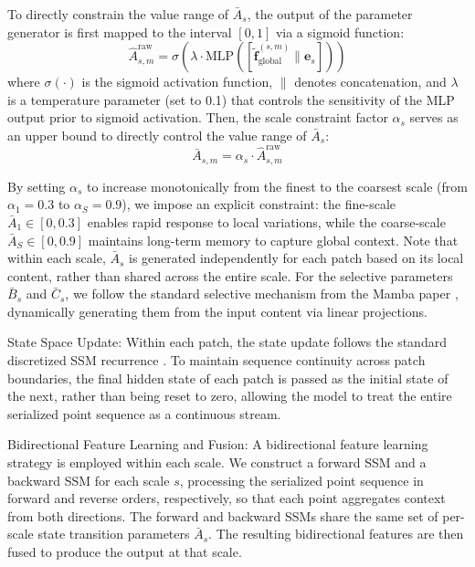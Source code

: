 \documentclass[a4paper,fleqn]{cas-sc}
\begin{document}
To directly constrain the value range of $\bar{A}_s$, the output of the parameter generator is first mapped to the interval $[0,1]$ via a sigmoid function:
\begin{equation}
	\hat{A}_{s,m}^{\text{raw}} = \sigma(\lambda \cdot \text{MLP}([\tilde{\mathbf{f}}_{\text{global}}^{(s,m)} \| \mathbf{e}_s]))
\end{equation}
where $\sigma(\cdot)$ is the sigmoid activation function, $\|$ denotes concatenation, and $\lambda$ is a temperature parameter (set to 0.1) that controls the sensitivity of the MLP output prior to sigmoid activation. Then, the scale constraint factor $\alpha_s$ serves as an upper bound to directly control the value range of $\bar{A}_s$:
\begin{equation}
	\bar{A}_{s,m} = \alpha_s \cdot \hat{A}_{s,m}^{\text{raw}}
\end{equation}

By setting $\alpha_s$ to increase monotonically from the finest to the coarsest scale (from $\alpha_1 = 0.3$ to $\alpha_S = 0.9$), we impose an explicit constraint: the fine-scale $\bar{A}_1 \in [0, 0.3]$ enables rapid response to local variations, while the coarse-scale $\bar{A}_S \in [0, 0.9]$ maintains long-term memory to capture global context. Note that within each scale, $\bar{A}_s$ is generated independently for each patch based on its local content, rather than shared across the entire scale. For the selective parameters $\bar{B}_s$ and $\bar{C}_s$, we follow the standard selective mechanism from the Mamba paper \cite{Mamba}, dynamically generating them from the input content via linear projections.

State Space Update: Within each patch, the state update follows the standard discretized SSM recurrence \cite{Mamba}. To maintain sequence continuity across patch boundaries, the final hidden state of each patch is passed as the initial state of the next, rather than being reset to zero, allowing the model to treat the entire serialized point sequence as a continuous stream.

Bidirectional Feature Learning and Fusion: A bidirectional feature learning strategy is employed within each scale. We construct a forward SSM and a backward SSM for each scale $s$, processing the serialized point sequence in forward and reverse orders, respectively, so that each point aggregates context from both directions. The forward and backward SSMs share the same set of per-scale state transition parameters $\bar{A}_s$. The resulting bidirectional features are then fused to produce the output at that scale.
\end{document}
